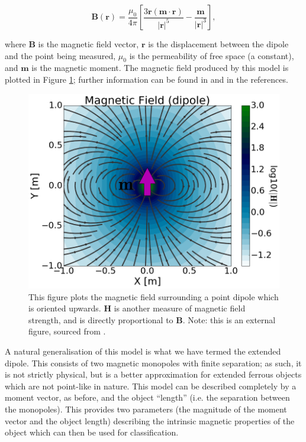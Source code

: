 \documentclass[10pt, a4paper, twocolumn]{article} %
\begin{document}
\begin{equation}
	{\mathbf{B} ({\mathbf{r} }) = {\frac{\mu_{0}}{4\pi}} \left[{\frac {3\mathbf{r} (\mathbf{m} \cdot \mathbf {r} )}{\lvert \mathbf{r} \rvert^{5}}}-{\frac {\mathbf {m} }{\lvert \mathbf{r} \rvert^{3}}} \right],}
	\label{dipole_eq}
\end{equation}

where $\mathbf{B}$ is the magnetic field vector, $\mathbf{r}$ is the displacement between the dipole and the point being measured, $\mu_0$ is the permeability of free space (a constant),  and $\mathbf{m}$ is the magnetic moment.
The magnetic field produced by this model is plotted in Figure \ref{dipole_field}; further information can be found in \parencite{WikiDipole} and \parencite{HPDipole} in the references.

\begin{figure}
	\includegraphics[width=\linewidth]{Figures/dipole_field.png} %
	\caption{This figure plots the magnetic field surrounding a point dipole which is oriented upwards. $\mathbf{H}$ is another measure of magnetic field strength, and is directly proportional to $\mathbf{B}$. Note: this is an external figure, sourced from \parencite{DefiningDipole}.}
	\label{dipole_field}
\end{figure}


A natural generalisation of this model is what we have termed the extended dipole. This consists of two magnetic monopoles with finite separation; as such, it is not strictly physical, but is a better approximation for extended ferrous objects which are not point-like in nature. This model can be described completely by a moment vector, as before, and the object “length” (i.e. the separation between the monopoles). This provides two parameters (the magnitude of the moment vector and the object length) describing the intrinsic magnetic properties of the object which can then be used for classification.
\end{document}
